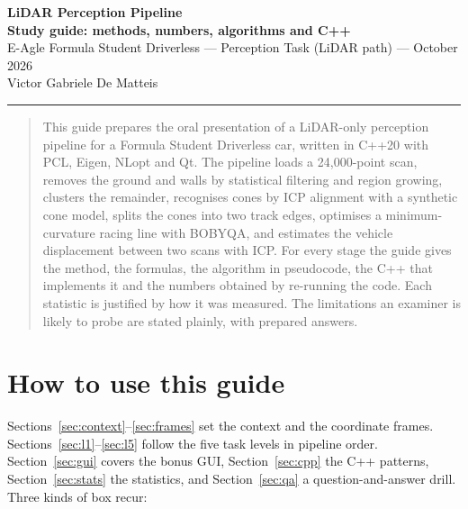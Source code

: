 \documentclass[10pt,a4paper]{scrartcl}
\renewcommand{\emph}[1]{\textcolor{accent}{#1}}
\newcommand{\RuleSection}[1]{%
    \section{#1}%
    \vspace{0.2em}{\color{accent!35}\hrule height 0.4pt}\vspace{0.3em}%
  }
\begin{document}

  \begin{center}
    {\Huge\bfseries\color{accent} LiDAR Perception Pipeline}\\[0.15cm]
    {\large\bfseries Study guide: methods, numbers, algorithms and C++}\\[0.25cm]
    {\small E-Agle Formula Student Driverless --- Perception Task (LiDAR path) --- October 2026}\\[0.15cm]
    {\small Victor Gabriele De Matteis}\\[0.2cm]
    {\color{accent!35}\hrule height 0.5pt}
  \end{center}

  \vspace{0.3em}

  \begin{abstract}
  \noindent
  This guide prepares the oral presentation of a LiDAR-only perception pipeline for a
  Formula Student Driverless car, written in C++20 with PCL, Eigen, NLopt and Qt.
  The pipeline loads a 24,000-point scan, removes the ground and walls by statistical
  filtering and region growing, clusters the remainder, recognises cones by ICP
  alignment with a synthetic cone model, splits the cones into two track edges,
  optimises a minimum-curvature racing line with BOBYQA, and estimates the
  vehicle displacement between two scans with ICP. For every stage the guide gives
  the method, the formulas, the algorithm in pseudocode, the C++ that implements it
  and the \emph{numbers obtained by re-running the code}. Each statistic is
  justified by how it was measured. The limitations an examiner is likely to probe
  are stated plainly, with prepared answers.
  \end{abstract}

  \tableofcontents

  \RuleSection{How to use this guide}
  \label{sec:howto}

  Sections~\ref{sec:context}--\ref{sec:frames} set the context and the coordinate
  frames. Sections~\ref{sec:l1}--\ref{sec:l5} follow the five task levels in
  pipeline order. Section~\ref{sec:gui} covers the bonus GUI,
  Section~\ref{sec:cpp} the C++ patterns, Section~\ref{sec:stats} the statistics,
  and Section~\ref{sec:qa} a question-and-answer drill. Three kinds of box recur:
\end{document}
